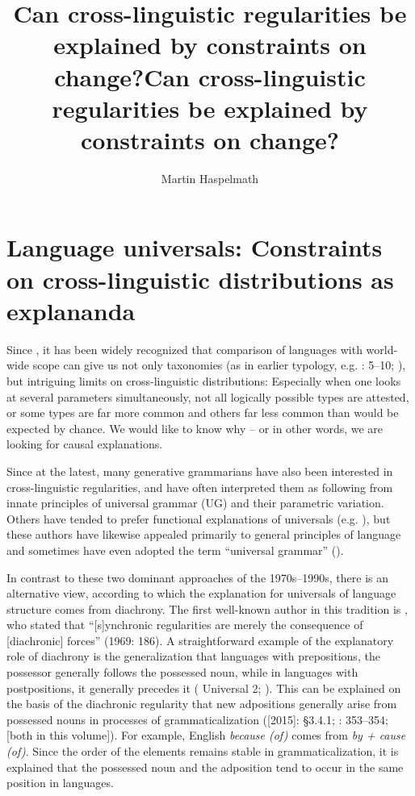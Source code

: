 \documentclass[output=paper]{langsci/langscibook}
\author{Martin Haspelmath\affiliation{MPI-SHH Jena \& Leipzig University}}
\title{Can cross-linguistic regularities be explained by constraints on change?}
\begin{document}
\maketitle 

\title{{Can cross-linguistic} regularities be explained by constraints on change?}

 
 

\section{Language universals: Constraints on cross-linguistic distributions as explananda}

Since \citet{Greenberg1963}, it has been widely recognized that comparison of languages with world-wide scope can give us not only taxonomies (as in earlier typology, e.g. \citealt{Schlegel1808,Schleicher1850}: 5–10; \citealt{Sapir1921}), but intriguing limits on cross-linguistic distributions: Especially when one looks at several parameters simultaneously, not all logically possible types are attested, or some types are far more common and others far less common than would be expected by chance. We would like to know why – or in other words, we are looking for causal explanations.

Since \citet{Chomsky1981} at the latest, many generative grammarians have also been interested in cross-linguistic regularities, and have often interpreted them as following from innate principles of universal grammar (UG) and their parametric variation. Others have tended to prefer functional explanations of universals (e.g. \citealt{Comrie1989,Stassen1985,Dixon1994,Dik1997,Hawkins2014}), but these authors have likewise appealed primarily to general principles of language and sometimes have even adopted the term “universal grammar” (\citealt{KeenanComrie1977,FoleyVanValin1984,Stassen1985}).

In contrast to these two dominant approaches of the 1970s–1990s, there is an alternative view, according to which the explanation for universals of language structure comes from diachrony. The first well-known author in this tradition is \citet{Greenberg1969}, who stated that “[s]ynchronic regularities are merely the consequence of [diachronic] forces” (1969: 186). A straightforward example of the explanatory role of diachrony is the generalization that languages with prepositions, the possessor generally follows the possessed noun, while in languages with postpositions, it generally precedes it ( Universal 2; \citealt{Dryer1992}). This can be explained on the basis of the diachronic regularity that new adpositions generally arise from possessed nouns in processes of grammaticalization (\citealt{Lehmann1982}[2015]: §3.4.1; \citealt{Bybee1988}: 353–354; \citealt{Collins2019tv,Dryer2019tv} [both in  this volume]). For example, English \textit{because (of)} comes from \textit{by + cause (of)}. Since the order of the elements remains stable in grammaticalization, it is explained that the possessed noun and the adposition tend to occur in the same position in languages.
\end{document}
